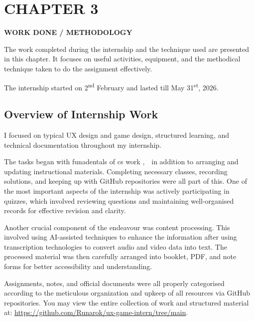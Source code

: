 \documentclass[12pt]{article}
\begin{document}

\newpage
\section*{CHAPTER 3}

\setcounter{subsection}{0}
\renewcommand{\thesubsection}{3.\arabic{subsection}}

\begin{center}
\textbf{\Large WORK DONE / METHODOLOGY}
\end{center}

The work completed during the internship and the technique used are presented in this chapter. It focuses on useful activities, equipment, and the methodical technique taken to do the assignment effectively.

The internship started on 2\textsuperscript{nd} February and lasted till May 31\textsuperscript{st}, 2026.

\subsection{Overview of Internship Work}

I focused on typical UX design and game design, structured learning, and technical documentation throughout my internship.

The tasks began with funadentals of cs work ,  in addition to arranging and updating instructional materials. Completing necessary classes, recording solutions, and keeping up with GitHub repositories were all part of this. One of the most important aspects of the internship was actively participating in quizzes, which involved reviewing questions and maintaining well-organised records for effective revision and clarity.

Another crucial component of the endeavour was content processing. This involved using AI-assisted techniques to enhance the information after using transcription technologies to convert audio and video data into text. The processed material was then carefully arranged into booklet, PDF, and note forms for better accessibility and understanding.

Assignments, notes, and official documents were all properly categorised according to the meticulous organization and upkeep of all resources via GitHub repositories. You may view the entire collection of work and structured material at: \url{https://github.com/Runarok/ux-game-intern/tree/main}.
\end{document}
